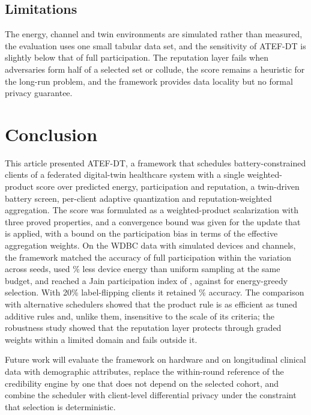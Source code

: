 \FloatBarrier
\subsection{Limitations}
\label{subsec:limitations}
\begin{revblock}The energy, channel and twin environments are simulated rather than measured, the evaluation uses one small tabular data set, and the sensitivity of ATEF-DT is slightly below that of full participation. The reputation layer fails when adversaries form half of a selected set or collude, the score remains a heuristic for the long-run problem, and the framework provides data locality but no formal privacy guarantee.\end{revblock}

\section{Conclusion}
\label{sec:conclusion}
This article presented ATEF-DT, a framework that schedules battery-constrained clients of a federated digital-twin healthcare system with a single weighted-product score over predicted energy, participation and reputation, a twin-driven battery screen, per-client adaptive quantization and reputation-weighted aggregation. The score was formulated as a weighted-product scalarization with three proved properties, and a convergence bound was given for the update that is applied, with a bound on the participation bias in terms of the effective aggregation weights. On the WDBC data with simulated devices and channels, the framework matched the accuracy of full participation within the variation across seeds, used \% less device energy than uniform sampling at the same budget, and reached a Jain participation index of , against  for energy-greedy selection. With 20\% label-flipping clients it retained \% accuracy. The comparison with alternative schedulers showed that the product rule is as efficient as tuned additive rules and, unlike them, insensitive to the scale of its criteria; the robustness study showed that the reputation layer protects through graded weights within a limited domain and fails outside it.

Future work will evaluate the framework on hardware and on longitudinal clinical data with demographic attributes, replace the within-round reference of the credibility engine by one that does not depend on the selected cohort, and combine the scheduler with client-level differential privacy under the constraint that selection is deterministic.

